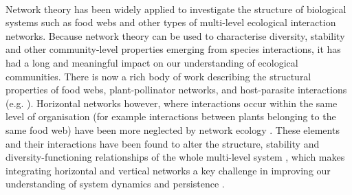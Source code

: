 \documentclass[a4,12pt]{article}
\begin{document}
    \paragraph{}
    Network theory has been widely applied to investigate the structure of biological systems such as food webs and other types of multi-level ecological interaction networks. Because network theory can be used to characterise diversity, stability and other community-level properties emerging from species interactions, it has had a long and meaningful impact on our understanding of ecological communities. There is now a rich body of work describing the structural properties of food webs, plant-pollinator networks, and host-parasite interactions (e.g. \cite{Lafferty2008, Thompson2012, Dunne2013, Stouffer2014, Cirtwill2015a}). Horizontal networks however, where interactions occur within the same level of organisation (for example interactions between plants belonging to the same food web) have been more neglected by network ecology \parencite{Ellison2019}. These elements and their interactions have been found to alter the structure, stability and diversity-functioning relationships of the whole multi-level system \parencite{Hammill2015, Giling2019, Zhao2019, Miele2019}, which makes integrating horizontal and vertical networks a key challenge in improving our understanding of system dynamics and persistence \parencite{Godoy2018c}.

\end{document}
